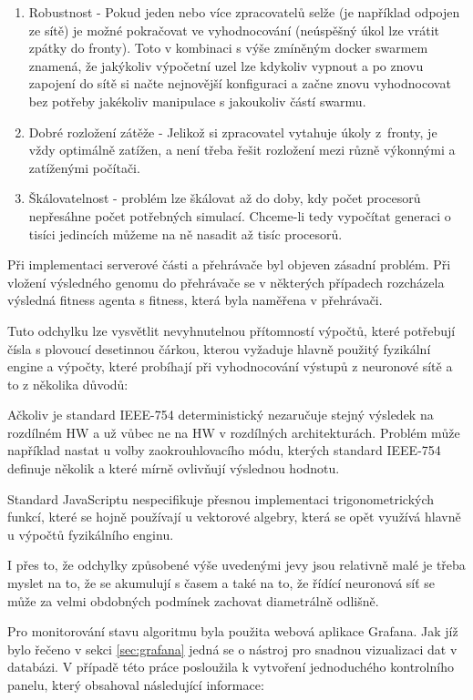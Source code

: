 \begin{enumerate}
	\item Robustnost - Pokud jeden nebo více zpracovatelů selže (je například odpojen ze sítě) je možné pokračovat ve vyhodnocování (neúspěšný úkol lze vrátit zpátky do fronty). Toto v kombinaci s výše zmíněným docker swarmem znamená, že jakýkoliv výpočetní uzel lze kdykoliv vypnout a po znovu zapojení do sítě si načte nejnovější konfiguraci a začne znovu vyhodnocovat bez potřeby jakékoliv manipulace s jakoukoliv částí swarmu.
	\item Dobré rozložení zátěže - Jelikož si zpracovatel vytahuje úkoly z~fronty, je vždy optimálně zatížen, a není třeba řešit rozložení mezi různě výkonnými a zatíženými počítači.
	\item Škálovatelnost - problém lze škálovat až do doby, kdy počet procesorů nepřesáhne počet potřebných simulací. Chceme-li tedy vypočítat generaci o tisíci jedincích můžeme na ně nasadit až tisíc procesorů.
\end{enumerate}

\label{sec:ImplementationTroubles}
Při implementaci serverové části a přehrávače byl objeven zásadní problém. Při vložení výsledného genomu do přehrávače se v některých případech rozcházela výsledná fitness agenta s fitness, která byla naměřena v přehrávači. 

Tuto odchylku lze vysvětlit nevyhnutelnou přítomností výpočtů, které potřebují čísla s plovoucí desetinnou čárkou, kterou vyžaduje hlavně použitý fyzikální engine a výpočty, které probíhají při vyhodnocování výstupů z neuronové sítě a to z několika důvodů:

Ačkoliv je standard IEEE-754 deterministický nezaručuje stejný výsledek na rozdílném HW a už vůbec ne na HW v rozdílných architekturách. Problém může například nastat u volby zaokrouhlovacího módu, kterých standard IEEE-754 definuje několik a které mírně ovlivňují výslednou hodnotu.

Standard JavaScriptu nespecifikuje přesnou implementaci trigonometrických funkcí, které se hojně používají u vektorové algebry, která se opět využívá hlavně u výpočtů fyzikálního enginu.

I přes to, že odchylky způsobené výše uvedenými jevy jsou relativně malé je třeba myslet na to, že se akumulují s časem a také na to, že řídící neuronová síť se může za velmi obdobných podmínek zachovat diametrálně odlišně.

Pro monitorování stavu algoritmu byla použita webová aplikace Grafana. Jak jíž bylo řečeno v sekci \ref{sec:grafana} jedná se o nástroj pro snadnou vizualizaci dat v databázi. V případě této práce posloužila k vytvoření jednoduchého kontrolního panelu, který obsahoval následující informace:

